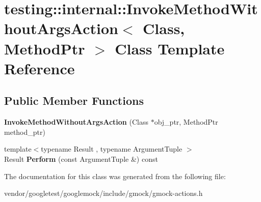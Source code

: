 \hypertarget{classtesting_1_1internal_1_1_invoke_method_without_args_action}{}\section{testing\+:\+:internal\+:\+:Invoke\+Method\+Without\+Args\+Action$<$ Class, Method\+Ptr $>$ Class Template Reference}
\label{classtesting_1_1internal_1_1_invoke_method_without_args_action}
\subsection*{Public Member Functions}
\begin{DoxyCompactItemize}
\item 
\mbox{\label{classtesting_1_1internal_1_1_invoke_method_without_args_action_ac4d655e386f47a96c7a6e1670b20e991}} 
{\bfseries Invoke\+Method\+Without\+Args\+Action} (Class $\ast$obj\+\_\+ptr, Method\+Ptr method\+\_\+ptr)
\item 
\mbox{\label{classtesting_1_1internal_1_1_invoke_method_without_args_action_a9915e4f7a064e00b7798216644670b52}} 
{\footnotesize template$<$typename Result , typename Argument\+Tuple $>$ }\\Result {\bfseries Perform} (const Argument\+Tuple \&) const
\end{DoxyCompactItemize}


The documentation for this class was generated from the following file\+:\begin{DoxyCompactItemize}
\item 
vendor/googletest/googlemock/include/gmock/gmock-\/actions.\+h\end{DoxyCompactItemize}
